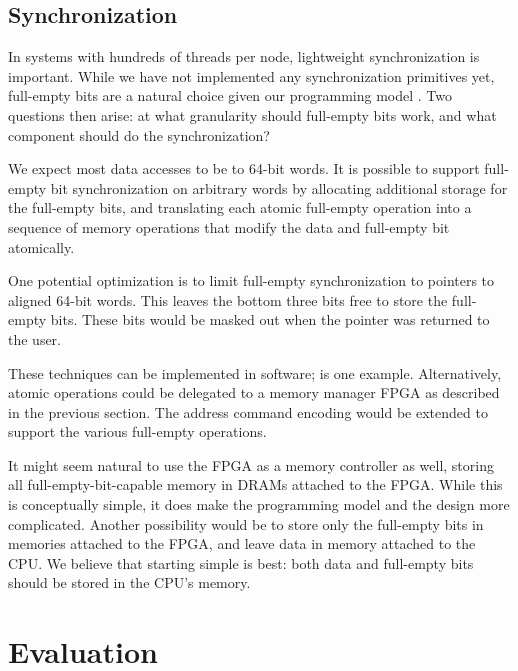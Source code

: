 \documentclass{acm_proc_article-sp}
\begin{document}
\subsection{Synchronization}

In systems with hundreds of threads per node, lightweight
synchronization is important. While we have not implemented any
synchronization primitives yet, full-empty bits are a natural choice
given our programming model . Two questions then arise: at what
granularity should full-empty bits work, and what component should do
the synchronization?

We expect most data accesses to be to 64-bit words. It is possible to
support full-empty bit synchronization on arbitrary words by
allocating additional storage for the full-empty bits, and translating
each atomic full-empty operation into a sequence of memory operations
that modify the data and full-empty bit atomically. 

One potential optimization is to limit full-empty synchronization to
pointers to aligned 64-bit words. This leaves the bottom three bits
free to store the full-empty bits. These bits would be masked out when
the pointer was returned to the user.

These techniques can be implemented in software; \cite{qthreads} is
one example. Alternatively, atomic operations could be delegated to a
memory manager FPGA as described in the previous section. The address
command encoding would be extended to support the various full-empty
operations.

It might seem natural to use the FPGA as a memory controller as
well, storing all full-empty-bit-capable memory in DRAMs attached to
the FPGA. While this is conceptually simple, it does make the
programming model and the design more complicated. Another possibility
would be to store only the full-empty bits in memories attached to the
FPGA, and leave data in memory attached to the CPU. We believe that
starting simple is best: both data and full-empty bits should be
stored in the CPU's memory. 


\section{Evaluation}
\label{sec:evaluation}
\end{document}
